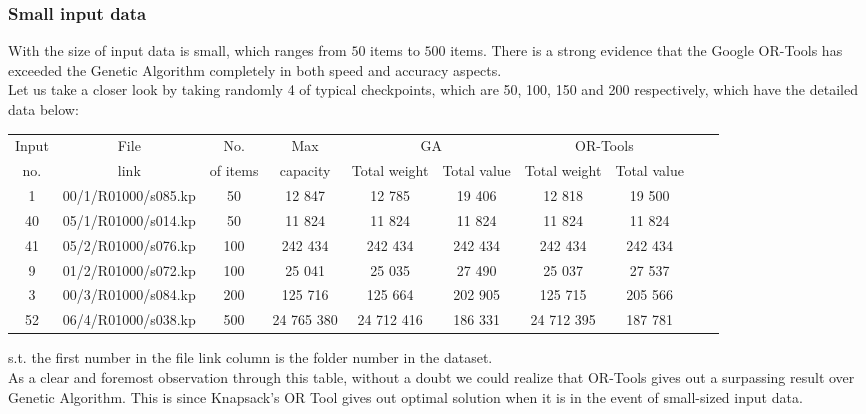 \documentclass{article}
\begin{document}
\subsubsection{Small input data}
    With the size of input data is small, which ranges from $50$ items to $500$ items. There is a strong evidence that the Google OR-Tools has exceeded the Genetic Algorithm completely in both speed and accuracy aspects. \\
    Let us take a closer look by taking randomly 4 of typical checkpoints, which are 50, 100, 150 and 200 respectively, which have the detailed data below: 
    \begin{center}
        \begin{tabular}{|c|c| c|c| c|c| c|c| c|c|}
        \hline
            Input& File& No. & Max& \multicolumn{2}{c|}{GA} & \multicolumn{2}{c|}{OR-Tools}\\
            no.&link& of items &capacity& Total weight & Total value & Total weight & Total value\\
        \hline
            1 & 00/1/R01000/s085.kp & 50 & 12 847 & 12 785 & 19 406 & 12 818 & 19 500\\
            40 & 05/1/R01000/s014.kp & 50 & 11 824 & 11 824 & 11 824 & 11 824 & 11 824\\
            41 & 05/2/R01000/s076.kp & 100 & 242 434 & 242 434 & 242 434 & 242 434 & 242 434\\
            9 & 01/2/R01000/s072.kp & 100 & 25 041 & 25 035 & 27 490 & 25 037 & 27 537\\
            3 & 00/3/R01000/s084.kp & 200 & 125 716 & 125 664 & 202 905 & 125 715 & 205 566\\
            52 & 06/4/R01000/s038.kp & 500 & 24 765 380 & 24 712 416 & 186 331 & 24 712 395 & 187 781\\
    \hline
        \hline 
        \end{tabular}
    \end{center}
    s.t. the first number in the file link column is the folder number in the dataset. \\
    
    As a clear and foremost observation through this table, without a doubt we could realize that OR-Tools gives out a surpassing result over Genetic Algorithm. This is since Knapsack's OR Tool gives out optimal solution when it is in the event of small-sized input data.
\end{document}
